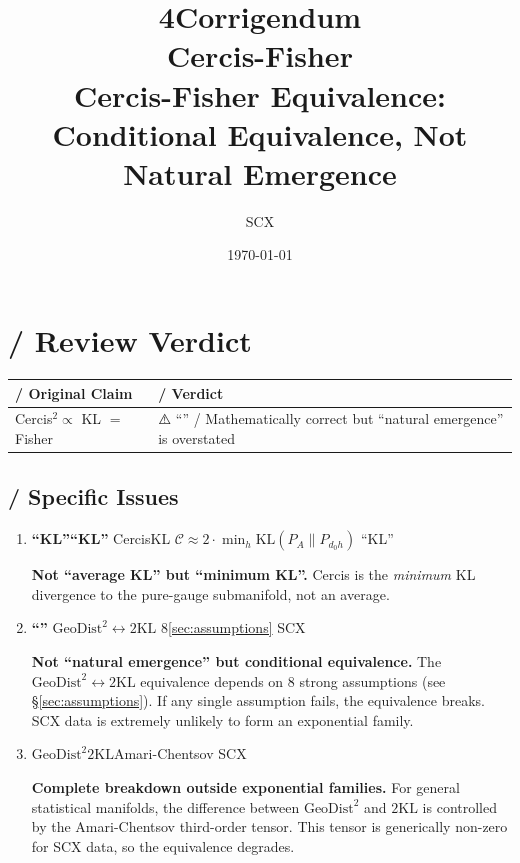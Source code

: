 \documentclass{article}
\title{\textbf{4Corrigendum} \\
\large Cercis-Fisher \\
\large Cercis-Fisher Equivalence: Conditional Equivalence, Not Natural Emergence}
\author{SCX}
\date{\today}
\newcommand{\GeoDist}{\mathrm{GeoDist}}
\newcommand{\KL}{\mathrm{KL}}
\newcommand{\cercis}{\mathcal{C}}
\begin{document}
\maketitle

\section{ / Review Verdict}

\begin{center}
\begin{tabular}{|p{6cm}|p{8cm}|}
\hline
\textbf{ / Original Claim} & \textbf{ / Verdict} \\
\hline
Cercis${}^2 \propto$ KL $=$ Fisher

& ⚠️ ``'' / Mathematically correct but ``natural emergence'' is overstated \\
\hline
\end{tabular}
\end{center}

\subsection{ / Specific Issues}

\begin{enumerate}[label=(\arabic*)]
    \item \textbf{``KL''``KL''}
    CercisKL
    $\cercis \approx 2 \cdot \min_{h} \KL(P_A \| P_{d_0 h})$
    ``KL''

    \textbf{Not ``average KL'' but ``minimum KL''.}
    Cercis is the \emph{minimum} KL divergence to the pure-gauge submanifold,
    not an average.

    \item \textbf{``''}
    $\GeoDist^2 \leftrightarrow 2\KL$ 8\ref{sec:assumptions}
    SCX

    \textbf{Not ``natural emergence'' but conditional equivalence.}
    The $\GeoDist^2 \leftrightarrow 2\KL$ equivalence depends on 8 strong assumptions (see \S\ref{sec:assumptions}).
    If any single assumption fails, the equivalence breaks. SCX data is extremely unlikely to form an exponential family.

    \item \textbf{}
    $\GeoDist^2$$2\KL$Amari-Chentsov
    SCX

    \textbf{Complete breakdown outside exponential families.}
    For general statistical manifolds, the difference between $\GeoDist^2$ and $2\KL$ is controlled
    by the Amari-Chentsov third-order tensor. This tensor is generically non-zero for SCX data,
    so the equivalence degrades.
\end{enumerate}
\end{document}
